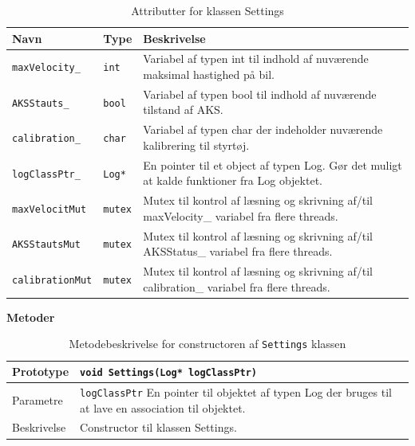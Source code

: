 \begin{table}[h]
\begin{tabularx}{\textwidth}{| L{3cm} | Z | L{10cm} |} \hline
Navn & Type & Beskrivelse \\\hline
\texttt{maxVelocity\_}			& \texttt{int}		&Variabel af typen int til indhold af nuværende maksimal hastighed på bil.\\\hline

\texttt{AKSStauts\_}			& \texttt{bool}		&Variabel af typen bool til indhold af nuværende tilstand af AKS.\\\hline

\texttt{calibration\_}			& \texttt{char}		&Variabel af typen char der indeholder nuværende kalibrering til styrtøj.\\\hline

\texttt{logClassPtr\_}			& \texttt{Log*}		&En pointer til et object af typen Log. Gør det muligt at kalde funktioner fra Log objektet.\\\hline

\texttt{maxVelocitMut}			& \texttt{mutex}	&Mutex til kontrol af læsning og skrivning af/til maxVelocity\_ variabel fra flere threads.\\\hline

\texttt{AKSStautsMut}			& \texttt{mutex}	&Mutex til kontrol af læsning og skrivning af/til AKSStatus\_ variabel fra flere threads.\\\hline

\texttt{calibrationMut}			& \texttt{mutex}	&Mutex til kontrol af læsning og skrivning af/til calibration\_ variabel fra flere threads.\\\hline
\end{tabularx}
\caption{Attributter for klassen Settings}
\label{table:attr_settings}
\end{table}

\clearpage

\textbf{Metoder}

\begin{table}[h]
\begin{tabularx}{\textwidth}{| L{2.5 cm} | Z |} \hline
Prototype 	& \texttt{void Settings(Log* logClassPtr)} \\\hline
Parametre 	& \texttt{logClassPtr} 		\newline En pointer til objektet af typen Log der bruges til at lave en association til objektet. \\\hline
Beskrivelse	& Constructor til klassen Settings.  \\\hline
\end{tabularx}
\caption{Metodebeskrivelse for constructoren af \texttt{Settings} klassen}
\label{table:met_settings}
\end{table}

